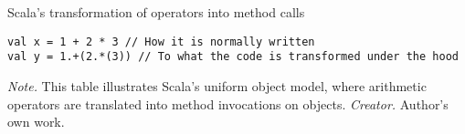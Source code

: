 \begin{table}[h!]
\caption{Scala's transformation of operators into method calls}
\begin{lstlisting}
val x = 1 + 2 * 3 // How it is normally written
val y = 1.+(2.*(3)) // To what the code is transformed under the hood
\end{lstlisting}
\small
\textit{Note.} This table illustrates Scala's uniform object model, where arithmetic operators are translated into method invocations on objects.
\textit{Creator.} Author's own work.
\end{table}